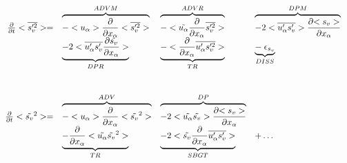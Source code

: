 \begin{displaymath}
\left.
\begin{array}{rllll}
\frac{\partial }{\partial t} <\overline{s_v'^2}> = & 
\overbrace{- <u_\alpha>\frac{\partial}{\partial x_\alpha} <\overline{s_v'^2}> }^{ADVM}  &
\overbrace{- <\tilde{u_\alpha}\frac{\partial}{\partial x_\alpha} \overline{s_v'^2} > }^{ADVR} &
\overbrace{- 2 <\overline{u_\alpha's_v'}> \frac{\partial {<s_v>}}{\partial x_\alpha} }^{DPM} \\
\vspace*{1.0cm}
& \underbrace{- 2 <\overline{u'_\alpha s_v'} \frac{\partial {\tilde{s_v}}}{\partial x_\alpha}>}_{DPR}  &
 \underbrace{- <\frac{\partial}{\partial x_\alpha} \overline{u'_\alpha s_v'^2}>}_{TR}
 & \underbrace{-\; \epsilon_{s_v}}_{DISS}\\
\frac{\partial }{\partial t} <\tilde{s_v}^2> = & 
\overbrace{- <u_\alpha>\frac{\partial}{\partial x_\alpha} <\tilde{s_v}^2> }^{ADV} &
\overbrace{- 2<\tilde{u_\alpha} \tilde{s_v}> \frac{\partial {<s_v>}}{\partial x_\alpha}}^{DP} &\\
& \underbrace{- \frac{\partial}{\partial x_\alpha} <\tilde{u_\alpha} \tilde{s_v}^2>}_{TR} &
\underbrace{- 2 <\tilde{s_v}\frac{\partial}{\partial x_\alpha}\overline{u'_\alpha s_v'}>}_{SBGT} & + \ldots
\end{array}
\right.
\end{displaymath}

